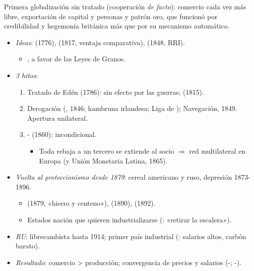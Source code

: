 \documentclass{article}
\begin{document}
\begin{columnas}
\begin{ideaclave}
Primera globalización sin tratado (cooperación \emph{de facto}): comercio cada vez más libre, exportación de capital y personas y patrón oro, que funcionó por credibilidad y hegemonía británica más que por su mecanismo automático.
\end{ideaclave}

\begin{itemize}
\item \emph{Ideas}:  (1776),  (1817, ventaja comparativa),  (1848, RRI).
  \begin{itemize}
  \item {}, a favor de las Leyes de Granos.
  \end{itemize}
\item \emph{3 hitos}:
  \begin{enumerate}
  \item Tratado de Edén (1786): sin efecto por las guerras;  (1815).
  \item Derogación (, 1846; hambruna irlandesa; Liga de ); Navegación, 1849. Apertura unilateral.
  \item {}- (1860):  incondicional.
    \begin{itemize}
    \item Toda rebaja a un tercero se extiende al socio $\Rightarrow$ red multilateral en Europa (y Unión Monetaria Latina, 1865).
    \end{itemize}
  \end{enumerate}
\item \emph{Vuelta al proteccionismo desde 1879}: cereal americano y ruso, depresión 1873-1896.
  \begin{itemize}
  \item {} (1879, «hierro y centeno»),  (1890),  (1892).
  \item Estados nación que quieren industrializarse (: «retirar la escalera»).
  \end{itemize}
\item \emph{RU}: librecambista hasta 1914; primer país industrial (: salarios altos, carbón barato).
\item \emph{Resultado}: comercio > producción; convergencia de precios y salarios (-; -).
\end{itemize}


\end{columnas}
\end{document}
